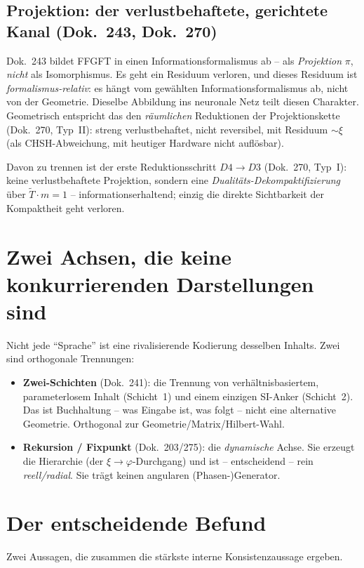 \subsection{Projektion: der verlustbehaftete, gerichtete Kanal (Dok.~243, Dok.~270)}
Dok.~243 bildet FFGFT in einen Informationsformalismus ab -- als \emph{Projektion} $\pi$,
\emph{nicht} als Isomorphismus. Es geht ein Residuum verloren, und dieses Residuum ist
\emph{formalismus-relativ}: es hängt vom gewählten Informationsformalismus ab, nicht von der
Geometrie. Dieselbe Abbildung ins neuronale Netz teilt diesen Charakter. Geometrisch entspricht
das den \emph{räumlichen} Reduktionen der Projektionskette (Dok.~270, Typ~II): streng
verlustbehaftet, nicht reversibel, mit Residuum $\sim\xi$ (als CHSH-Abweichung, mit heutiger Hardware nicht auflösbar).

Davon zu trennen ist der erste Reduktionsschritt $D4\!\to\!D3$ (Dok.~270, Typ~I): keine
verlustbehaftete Projektion, sondern eine \emph{Dualitäts-Dekompaktifizierung} über
$\tilde T\cdot m=1$ -- informationserhaltend; einzig die direkte Sichtbarkeit der Kompaktheit geht
verloren.

\section{Zwei Achsen, die keine konkurrierenden Darstellungen sind}
Nicht jede \enquote{Sprache} ist eine rivalisierende Kodierung desselben Inhalts. Zwei sind
orthogonale Trennungen:
\begin{itemize}
  \item \textbf{Zwei-Schichten} (Dok.~241): die Trennung von verhältnisbasiertem, parameterlosem
        Inhalt (Schicht~1) und einem einzigen SI-Anker (Schicht~2). Das ist Buchhaltung -- was
        Eingabe ist, was folgt -- nicht eine alternative Geometrie. Orthogonal zur
        Geometrie/Matrix/Hilbert-Wahl.
  \item \textbf{Rekursion / Fixpunkt} (Dok.~203/275): die \emph{dynamische} Achse. Sie erzeugt
        die Hierarchie (der $\xi\!\to\!\varphi$-Durchgang) und ist -- entscheidend -- rein
        \emph{reell/radial}. Sie trägt keinen angularen (Phasen-)Generator.
\end{itemize}

\section{Der entscheidende Befund}
Zwei Aussagen, die zusammen die stärkste interne Konsistenzaussage ergeben.

